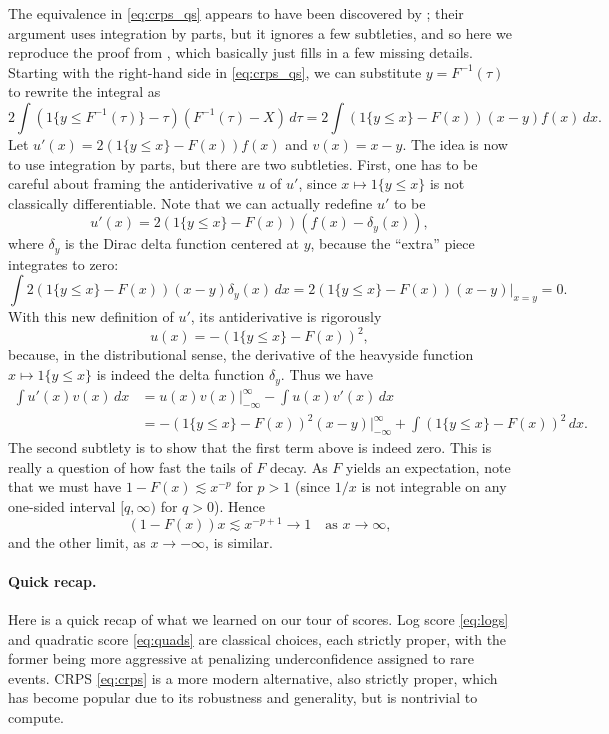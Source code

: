 \documentclass{article}
\begin{document}
The equivalence in \eqref{eq:crps_qs} appears to have been discovered by
\citet{laio2007verification}; their argument uses integration by parts, but it
ignores a few subtleties, and so here we reproduce the proof from
\citet{fakoor2021flexible}, which basically just fills in a few missing details.
Starting with the right-hand side in \eqref{eq:crps_qs}, we can substitute 
$y=F^{-1}(\tau)$ to rewrite the integral as   
\[
2 \int (1\{y \leq F^{-1}(\tau)\} - \tau) (F^{-1}(\tau)-X) \, d\tau =  
2 \int (1\{y \leq x\} - F(x)) (x-y) f(x) \, dx.
\]
Let $u'(x)=2(1\{y \leq x\} - F(x)) f(x)$ and $v(x)=x-y$. The idea is now to use 
integration by parts, but there are two subtleties. First, one has to be careful 
about framing the antiderivative $u$ of $u'$, since $x \mapsto 1\{y \leq x\}$ is
not classically differentiable. Note that we can actually redefine $u'$ to be   
\[
u'(x) = 2(1\{y \leq x\} - F(x)) (f(x) - \delta_y(x)),
\]
where $\delta_y$ is the Dirac delta function centered at $y$, because the
``extra'' piece integrates to zero:   
\[
\int 2(1\{y \leq x\} - F(x)) (x-y) \delta_y(x) \, dx =  
2(1\{y \leq x\} - F(x)) (x-y) \Big|_{x=y} = 0. 
\]
With this new definition of $u'$, its antiderivative is rigorously
\[
u(x) = -(1\{y \leq x\} - F(x))^2,
\] 
because, in the distributional sense, the derivative of the heavyside function
$x \mapsto 1\{y \leq x\}$ is indeed the delta function $\delta_y$. Thus we have   
\begin{align*}
\int u'(x) v(x) \, dx
&= u(x) v(x) \Big|_{-\infty}^\infty - \int u(x) v'(x) \,  dx \\ 
&= -(1\{y \leq x\} - F(x))^2 (x-y) \Big|_{-\infty}^\infty + 
\int (1\{y \leq x\} - F(x))^2 \, dx. 
\end{align*}
The second subtlety is to show that the first term above is indeed zero.  
This is really a question of how fast the tails of $F$ decay. As $F$ yields an
expectation, note that we must have $1-F(x) \lesssim x^{-p}$ for $p>1$ (since
$1/x$ is not integrable on any one-sided interval $[q,\infty)$ for $q>0$). Hence   
\[
(1-F(x)) x \lesssim x^{-p+1} \to 1 \quad \text{as $x \to \infty$},
\]
and the other limit, as $x \to -\infty$, is similar.

\paragraph{Quick recap.}

Here is a quick recap of what we learned on our tour of scores. Log score
\eqref{eq:logs} and quadratic score \eqref{eq:quads} are classical choices, each
strictly proper, with the former being more aggressive at penalizing
underconfidence assigned to rare events. CRPS \eqref{eq:crps} is a more modern
alternative, also strictly proper, which has become popular due to its
robustness and generality, but is nontrivial to compute.        
\end{document}
